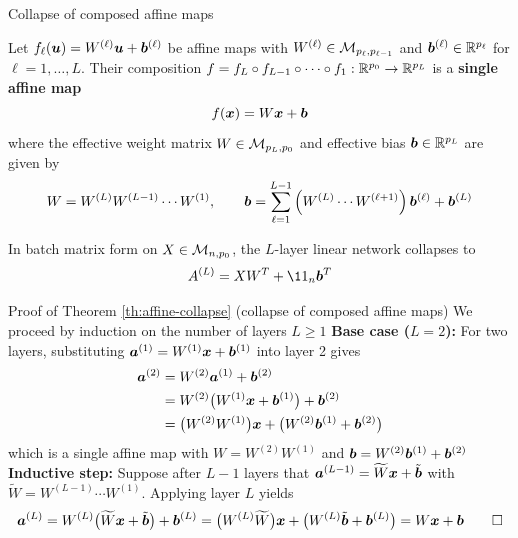 \documentclass[aspectratio=169]{beamer}\usepackage[]{graphicx}\usepackage[]{xcolor}
\begin{document}
\begin{frame}{Collapse of composed affine maps}
\begin{importanttheorem}
\label{th:affine-collapse}
Let $f_\ell(\bm{u}) = W^{(\ell)} \bm{u} + \bm{b}^{(\ell)}$ be affine maps with $W^{(\ell)} \in \mathcal{M}_{p_\ell, p_{\ell-1}}$ and $\bm{b}^{(\ell)} \in \mathbb{R}^{p_\ell}$ for $\ell = 1, \ldots, L$. Their composition $f = f_L \circ f_{L-1} \circ \cdots \circ f_1 : \mathbb{R}^{p_0} \to \mathbb{R}^{p_L}$ is a \textbf{single affine map}
\[
f(\bm{x}) = W \bm{x} + \bm{b}
\]
where the effective weight matrix $W \in \mathcal{M}_{p_L, p_0}$ and effective bias $\bm{b} \in \mathbb{R}^{p_L}$ are given by
\[
W = W^{(L)} W^{(L-1)} \cdots W^{(1)}, \qquad
\bm{b} = \sum_{\ell=1}^{L-1} \left(W^{(L)} \cdots W^{(\ell+1)}\right) \bm{b}^{(\ell)} + \bm{b}^{(L)}
\]
\end{importanttheorem}
\vfill
In batch matrix form on $X \in \mathcal{M}_{n, p_0}$, the $L$-layer linear network collapses to
\[
A^{(L)} = X W^T + \11_n \bb^T
\]
\end{frame}


\begin{frame}[importantcolour]{Proof of Theorem \ref{th:affine-collapse} (collapse of composed affine maps)}
We proceed by induction on the number of layers $L \ge 1$
\vfill
\textbf{Base case ($L = 2$):} For two layers, substituting $\bm{a}^{(1)} = W^{(1)} \bm{x} + \bm{b}^{(1)}$ into layer 2 gives
\begin{align*}
\bm{a}^{(2)} &= W^{(2)} \bm{a}^{(1)} + \bm{b}^{(2)} \\
&= W^{(2)}\big(W^{(1)} \bm{x} + \bm{b}^{(1)}\big) + \bm{b}^{(2)} \\
&= \big(W^{(2)} W^{(1)}\big) \bm{x} + \big(W^{(2)} \bm{b}^{(1)} + \bm{b}^{(2)}\big)
\end{align*}
which is a single affine map with $W = W^{(2)} W^{(1)}$ and $\bm{b} = W^{(2)} \bm{b}^{(1)} + \bm{b}^{(2)}$
\vfill
\textbf{Inductive step:} Suppose after $L-1$ layers that $\bm{a}^{(L-1)} = \widetilde{W} \bm{x} + \tilde{\bm{b}}$ with $\widetilde{W} = W^{(L-1)} \cdots W^{(1)}$. Applying layer $L$ yields
\[
\bm{a}^{(L)} = W^{(L)}\big(\widetilde{W} \bm{x} + \tilde{\bm{b}}\big) + \bm{b}^{(L)}
= \big(W^{(L)} \widetilde{W}\big) \bm{x} + \big(W^{(L)} \tilde{\bm{b}} + \bm{b}^{(L)}\big) = W \bm{x} + \bm{b} \qed
\]
\end{frame}
\end{document}
